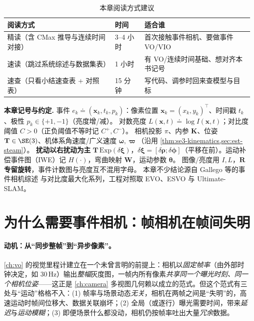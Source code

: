 \begin{table}[H]\centering\small
\caption{本章阅读方式建议}
\label{tab:event-reading}
\begin{tabular}{lll}
\toprule
阅读方式 & 时间 & 适合谁 \\
\midrule
精读（含 CMax 推导与连续时间对接） & 3--4 小时 & 首次接触事件相机、要做事件 VO/VIO \\
速读（跳过系统综述与数据集表） & 1 小时 & 有 VO/连续时间基础、想对齐本书记号 \\
速查（只看小结速查表 + 对照表） & 15 分钟 & 写代码、调参时回来查模型与目标 \\
\bottomrule
\end{tabular}
\end{table}

\begin{note}
\textbf{本章记号与约定.}\;
事件 $e_k\doteq(\mathbf x_k,t_k,p_k)$：像素位置 $\mathbf x_k=(x_k,y_k)^\top$、时间戳 $t_k$、极性 $p_k\in\{+1,-1\}$（亮度增/减）。
对数亮度 $L(\mathbf x,t)\doteq\log I(\mathbf x,t)$；对比度阈值 $C>0$（正负阈值不等时记 $C^+,C^-$）。
相机投影 $\pi$、内参 $\mathbf K$、位姿 $\mathbf T\in\SE(3)$、机体系角速度/广义速度 $\boldsymbol\omega,\boldsymbol\varpi$（沿用 \cref{thm:se3-kinematics,sec:est-steam}）。
\textbf{扰动以右扰动为主} $\mathbf T\,\mathrm{Exp}(\delta\boldsymbol\xi)$，$\delta\boldsymbol\xi=[\delta\boldsymbol\rho;\delta\boldsymbol\phi]$（平移在前）。运动补偿事件图（IWE）记 $H(\cdot)$，弯曲映射 $\mathbf W$，运动参数 $\boldsymbol\theta$。
图像/亮度用 $I,L$，\textbf{$\mathbf R$ 专留旋转}，事件计数图与亮度互不混用字母。
本章不少结论源自 Gallego 等的事件相机综述\cite{gallego2022eventsurvey} 与对比度最大化系列\cite{gallego2018cmax}，工程对照取 EVO\cite{rebecq2017evo}、ESVO\cite{zhou2021esvo} 与 Ultimate-SLAM\cite{vidal2018ultimate}。
\end{note}

\section{为什么需要事件相机：帧相机在帧间失明}
\label{sec:event-why}

\paragraph{动机：从“同步整帧”到“异步像素”。}
\cref{ch:vo} 的视觉里程计建立在一个未曾言明的前提上：相机以\emph{固定帧率}（由外部时钟决定，如 $30$\,Hz）输出\emph{整幅}灰度图，一帧内所有像素\emph{共享同一个曝光时刻、同一个相机位姿}——这正是 \cref{ch:camera} 多视图几何赖以成立的范式\cite{gallego2022eventsurvey}。但这个范式有三处与“运动”格格不入：(1) 帧率与场景动态\emph{无关}，相机在两帧之间是“失明”的，高速运动时帧间位移大、数据关联崩坏；(2) 全局（或逐行）曝光需要时间，带来\emph{延迟}与\emph{运动模糊}；(3) 即便场景什么都没动，相机仍按帧率吐出大量\emph{冗余}数据。

